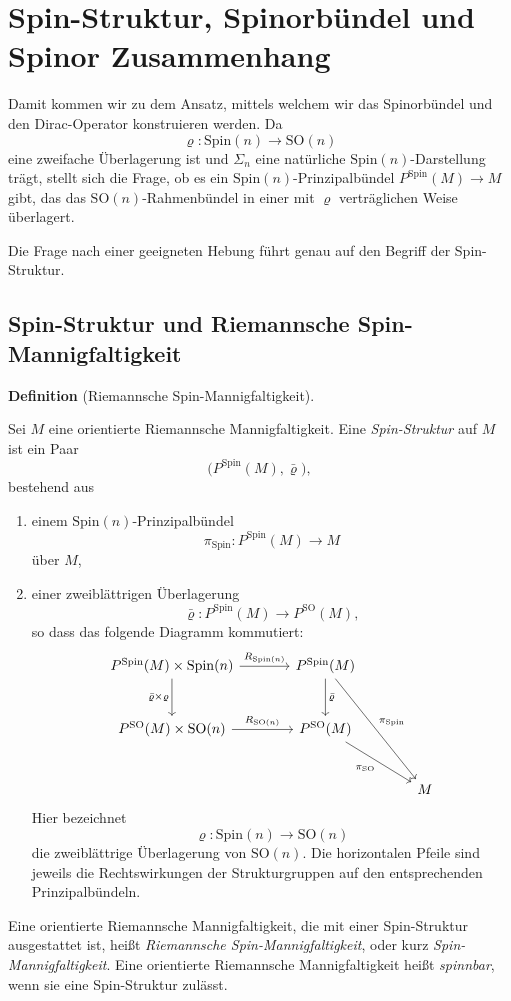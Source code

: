 \documentclass[10pt, letterpaper]{article}
\newcommand{\SO}{\mathrm{SO}}
\newcommand{\Spin}{\mathrm{Spin}}
\newcommand{\CustomHeading}[3]{%
  \par\medskip\noindent%
  \textbf{#1 #2} \textnormal{(#3)}.\enskip%
}
\newenvironment{DEF}[2]{\CustomHeading{Definition}{#1}{#2}}{}
\begin{document}
\pagebreak

\section{Spin-Struktur, Spinorbündel und Spinor Zusammenhang}

Damit kommen wir zu dem Ansatz, mittels welchem wir das Spinorbündel und den Dirac-Operator konstruieren werden. Da
\[
\varrho:\Spin(n)\to \SO(n)
\]
eine zweifache Überlagerung ist und \(\Sigma_n\) eine natürliche
\(\Spin(n)\)-Darstellung trägt, stellt sich die Frage, ob es ein
\(\Spin(n)\)-Prinzipalbündel \(P^{\Spin}(M)\to M\) gibt, das das
\(\SO(n)\)-Rahmenbündel in einer mit \(\varrho\) verträglichen Weise überlagert.

Die Frage nach einer geeigneten Hebung führt genau auf den Begriff der Spin-Struktur.



\subsection{Spin-Struktur und Riemannsche Spin-Mannigfaltigkeit}


\begin{DEF}{}{Riemannsche Spin-Mannigfaltigkeit}
Sei \(M\) eine orientierte Riemannsche Mannigfaltigkeit. Eine \emph{Spin-Struktur}
auf \(M\) ist ein Paar
\[
\bigl(P^{\Spin}(M),\bar\varrho\bigr),
\]
bestehend aus
\begin{enumerate}
    \item einem \(\Spin(n)\)-Prinzipalbündel
    \[
    \pi_{\Spin}:P^{\Spin}(M)\to M
    \]
    über \(M\),
    \item einer zweiblättrigen Überlagerung
    \[
    \bar\varrho:P^{\Spin}(M)\to P^{\SO}(M),
    \]
    so dass das folgende Diagramm kommutiert:
    \[
    \begin{tikzcd}[column sep=large, row sep=large]
    P^{\Spin}(M)\times \Spin(n) \arrow[r,"R_{\Spin(n)}"] \arrow[d,"\bar\varrho\times \varrho"'] &
    P^{\Spin}(M) \arrow[rdd,"\pi_{\Spin}"] \arrow[d,"\bar\varrho"] & \\
    P^{\SO}(M)\times \SO(n) \arrow[r,"R_{\SO(n)}"] &
    P^{\SO}(M) \arrow[rd,"\pi_{\SO}"'] & \\
    & & M
    \end{tikzcd}
    \]
    Hier bezeichnet
    \[
    \varrho:\Spin(n)\to \SO(n)
    \]
    die zweiblättrige Überlagerung von \(\SO(n)\). Die horizontalen Pfeile sind
    jeweils die Rechtswirkungen der Strukturgruppen auf den entsprechenden
    Prinzipalbündeln.
\end{enumerate}

Eine orientierte Riemannsche Mannigfaltigkeit, die mit einer Spin-Struktur
ausgestattet ist, heißt \emph{Riemannsche Spin-Mannigfaltigkeit}, oder kurz \emph{Spin-Mannigfaltigkeit}. Eine orientierte Riemannsche Mannigfaltigkeit heißt \emph{spinnbar}, wenn sie eine Spin-Struktur zulässt.
\end{DEF}
\end{document}
